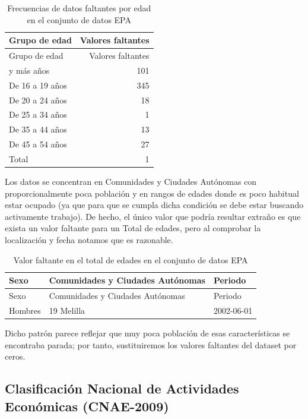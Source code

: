 \documentclass[Universitat de
València,article,submit,moreauthors,pdftex]{Definitions/mdpi}
\begin{document}
\begin{longtable}[]{@{}lr@{}}
\caption{Frecuencias de datos faltantes por edad en el conjunto de datos
EPA}\tabularnewline
\toprule\noalign{}
Grupo de edad & Valores faltantes \\
\midrule\noalign{}
\endfirsthead
\toprule\noalign{}
Grupo de edad & Valores faltantes \\
\midrule\noalign{}
\endhead
\bottomrule\noalign{}
\endlastfoot
55 y más años & 101 \\
De 16 a 19 años & 345 \\
De 20 a 24 años & 18 \\
De 25 a 34 años & 1 \\
De 35 a 44 años & 13 \\
De 45 a 54 años & 27 \\
Total & 1 \\
\end{longtable}

Los datos se concentran en Comunidades y Ciudades Autónomas con
proporcionalmente poca población y en rangos de edades donde es poco
habitual estar ocupado (ya que para que se cumpla dicha condición se
debe estar buscando activamente trabajo). De hecho, el único valor que
podría resultar extraño es que exista un valor faltante para un Total de
edades, pero al comprobar la localización y fecha notamos que es
razonable.

\begin{longtable}[]{@{}lll@{}}
\caption{Valor faltante en el total de edades en el conjunto de datos
EPA}\tabularnewline
\toprule\noalign{}
Sexo & Comunidades y Ciudades Autónomas & Periodo \\
\midrule\noalign{}
\endfirsthead
\toprule\noalign{}
Sexo & Comunidades y Ciudades Autónomas & Periodo \\
\midrule\noalign{}
\endhead
\bottomrule\noalign{}
\endlastfoot
Hombres & 19 Melilla & 2002-06-01 \\
\end{longtable}

Dicho patrón parece reflejar que muy poca población de esas
características se encontraba parada; por tanto, sustituiremos los
valores faltantes del dataset por ceros.

\subsection{\texorpdfstring{\textbf{Clasificación Nacional de
Actividades Económicas
(CNAE-2009)}}{Clasificación Nacional de Actividades Económicas (CNAE-2009)}}\label{clasificaciuxf3n-nacional-de-actividades-econuxf3micas-cnae-2009}
\end{document}
